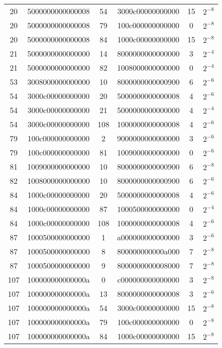 \begin{table}
\begin{tabular}{|c|c|c|c|c|c|}
        20 & 5000000000000008 & 54 & 3000c00000000000 & 15 & $2^{-8}$ \\
        20 & 5000000000000008 & 79 & 100c000000000000 & 0 & $2^{-8}$ \\
        20 & 5000000000000008 & 84 & 1000c00000000000 & 15 & $2^{-8}$ \\
        21 & 5000000000000000 & 14 & 8000000000000000 & 3 & $2^{-4}$ \\
        21 & 5000000000000000 & 82 & 1008000000000000 & 0 & $2^{-4}$ \\
        53 & 3008000000000000 & 10 & 8000000000000900 & 6 & $2^{-6}$ \\
        54 & 3000c00000000000 & 20 & 5000000000000008 & 4 & $2^{-6}$ \\
        54 & 3000c00000000000 & 21 & 5000000000000000 & 4 & $2^{-4}$ \\
        54 & 3000c00000000000 & 108 & 1000000000000008 & 4 & $2^{-6}$ \\
        79 & 100c000000000000 & 2 & 9000000000000000 & 3 & $2^{-6}$ \\
        79 & 100c000000000000 & 81 & 1009000000000000 & 0 & $2^{-6}$ \\
        81 & 1009000000000000 & 10 & 8000000000000900 & 6 & $2^{-8}$ \\
        82 & 1008000000000000 & 10 & 8000000000000900 & 6 & $2^{-6}$ \\
        84 & 1000c00000000000 & 20 & 5000000000000008 & 4 & $2^{-6}$ \\
        84 & 1000c00000000000 & 87 & 1000500000000000 & 0 & $2^{-4}$ \\
        84 & 1000c00000000000 & 108 & 1000000000000008 & 4 & $2^{-6}$ \\
        87 & 1000500000000000 & 1 & a000000000000000 & 3 & $2^{-6}$ \\
        87 & 1000500000000000 & 8 & 800000000000a000 & 7 & $2^{-8}$ \\
        87 & 1000500000000000 & 9 & 8000000000008000 & 7 & $2^{-8}$ \\
        107 & 100000000000000a & 0 & c000000000000000 & 3 & $2^{-8}$ \\
        107 & 100000000000000a & 13 & 8000000000000008 & 3 & $2^{-6}$ \\
        107 & 100000000000000a & 54 & 3000c00000000000 & 15 & $2^{-8}$ \\
        107 & 100000000000000a & 79 & 100c000000000000 & 0 & $2^{-8}$ \\
        107 & 100000000000000a & 84 & 1000c00000000000 & 15 & $2^{-8}$ \\

\end{tabular}
\end{table}
